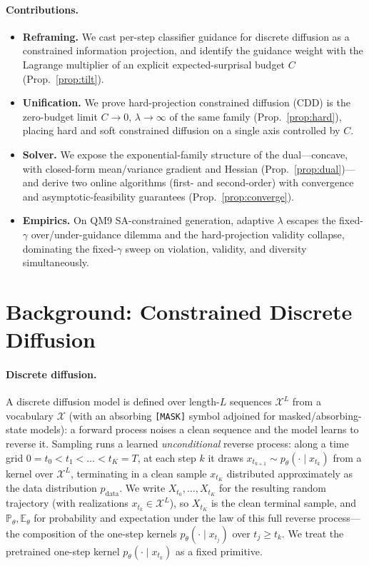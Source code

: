 \documentclass{article}
\newcommand{\E}{\mathbb{E}}
\newcommand{\X}{\mathcal{X}}
\begin{document}
\paragraph{Contributions.}
\begin{itemize}
\item \textbf{Reframing.} We cast per-step classifier guidance for discrete diffusion as a constrained information projection, and identify the guidance weight with the Lagrange multiplier of an explicit expected-surprisal budget $C$ (Prop.~\ref{prop:tilt}).
\item \textbf{Unification.} We prove hard-projection constrained diffusion (CDD) is the zero-budget limit $C\!\to\!0$, $\lambda\!\to\!\infty$ of the same family (Prop.~\ref{prop:hard}), placing hard and soft constrained diffusion on a single axis controlled by $C$.
\item \textbf{Solver.} We expose the exponential-family structure of the dual---concave, with closed-form mean/variance gradient and Hessian (Prop.~\ref{prop:dual})---and derive two online algorithms (first- and second-order) with convergence and asymptotic-feasibility guarantees (Prop.~\ref{prop:converge}).
\item \textbf{Empirics.} On QM9 SA-constrained generation, adaptive $\lambda$ escapes the fixed-$\gamma$ over/under-guidance dilemma and the hard-projection validity collapse, dominating the fixed-$\gamma$ sweep on violation, validity, and diversity simultaneously.
\end{itemize}

\section{Background: Constrained Discrete Diffusion}
\label{sec:background}

\paragraph{Discrete diffusion.} A discrete diffusion model is defined over length-$L$ sequences $\X^L$ from a vocabulary $\X$ (with an absorbing \texttt{[MASK]} symbol adjoined for masked/absorbing-state models): a forward process noises a clean sequence and the model learns to reverse it. Sampling runs a learned \emph{unconditional} reverse process: along a time grid $0{=}t_0<t_1<\dots<t_K{=}T$, at each step $k$ it draws $x_{t_{k+1}}\sim p_\theta(\cdot\mid x_{t_k})$ from a kernel over $\X^L$, terminating in a clean sample $x_{t_K}$ distributed approximately as the data distribution $p_{\mathrm{data}}$. We write $X_{t_0},\dots,X_{t_K}$ for the resulting random trajectory (with realizations $x_{t_k}\in\X^L$), so $X_{t_K}$ is the clean terminal sample, and $\mathbb P_\theta,\E_\theta$ for probability and expectation under the law of this full reverse process---the composition of the one-step kernels $p_\theta(\cdot\mid x_{t_j})$ over $t_j\ge t_k$. We treat the pretrained one-step kernel $p_\theta(\cdot\mid x_{t_k})$ as a fixed primitive.
\end{document}
